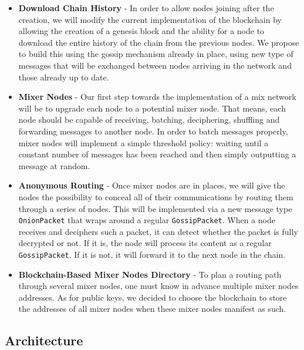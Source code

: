 \documentclass[11pt, a4paper]{article}
\begin{document}
\begin{itemize}
        \item \textbf{Download Chain History} -
        In order to allow nodes joining after the creation, we will modify the current implementation of the blockchain by allowing the creation of a genesis block and the ability for a node to download the entire history of the chain from the previous nodes.
        We propose to build this using the gossip mechanism already in place, using new type of messages that will be exchanged between nodes arriving in the network and those already up to date.

        \item \textbf{Mixer Nodes} -
        Our first step towards the implementation of a mix network will be to upgrade each node to a potential mixer node.
        That means, each node should be capable of receiving, batching, deciphering, shuffling and forwarding messages to another node.
        In order to batch messages properly, mixer nodes will implement a simple threshold policy: waiting until a constant number of messages has been reached and then simply outputting a message at random.

        \item \textbf{Anonymous Routing} -
        Once mixer nodes are in places, we will give the nodes the possibility to conceal all of their communications by routing them through a series of  nodes.
        This will be implemented via a new message type \texttt{OnionPacket} that wraps around a regular \texttt{GossipPacket}.
        When a node receives and deciphers such a packet, it can detect whether the packet is fully decrypted or not.
        If it is, the node will process its content as a regular \texttt{GossipPacket}.
        If it is not, it will forward it to the next node in the chain.

        \item \textbf{Blockchain-Based Mixer Nodes Directory} -
        To plan a routing path through several mixer nodes, one must know in advance multiple mixer nodes addresses.
        As for public keys, we decided to choose the blockchain to store the addresses of all mixer nodes when these mixer nodes manifest as such.

        \end{itemize}

    \subsection{Architecture}
\end{document}
